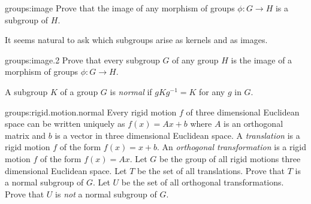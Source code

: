 \begin{problem}{groups:image}
Prove that the image of any morphism of groups \(\phi \colon G \to H\) is a subgroup of \(H\).
\end{problem}

It seems natural to ask which subgroups arise as kernels and as images.

\begin{problem}{groups:image.2}
Prove that every subgroup \(G\) of any group \(H\) is the image of a morphism of groups \(\phi \colon G \to H\).
\end{problem}

A subgroup \(K\) of a group \(G\) is \emph{normal} if \(gKg^{-1}=K\) for any \(g\) in \(G\).

\begin{problem}{groups:rigid.motion.normal}
Every rigid motion \(f\) of three dimensional Euclidean space can be written uniquely as \(f(x)=Ax+b\) where \(A\) is an orthogonal matrix and \(b\) is a vector in three dimensional Euclidean space.
A \emph{translation} is a rigid motion \(f\) of the form \(f(x)=x+b\).
An \emph{orthogonal transformation} is a rigid motion \(f\) of the form \(f(x)=Ax\).
Let \(G\) be the group of all rigid motions three dimensional Euclidean space.
Let \(T\) be the set of all translations.
Prove that \(T\) is a normal subgroup of \(G\).
Let \(U\) be the set of all orthogonal transformations.
Prove that \(U\) is \emph{not} a normal subgroup of \(G\).
\end{problem}

